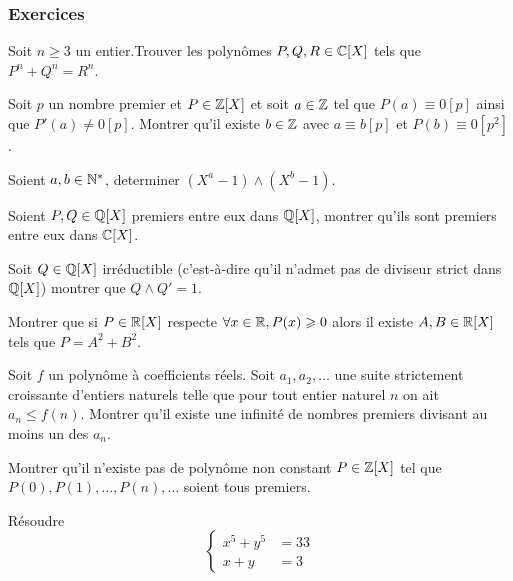 \subsubsection{Exercices}


\begin{exo}[Liouville,D]
Soit $n\ge 3 $ un entier.Trouver les polynômes $P,Q,R\in \mathbb C[X]$ tels que $P^n+Q^n=R^n$.
\end{exo}


\begin{exo}[Hensel,M-D]
Soit $p$ un nombre premier et $P\in \mathbb Z[X]$ et soit $a\in \mathbb Z$ tel que $P(a)\equiv 0 [p]$ ainsi que $P'(a)\ne 0 [p] $. Montrer qu'il existe $b\in \mathbb Z$ avec $a\equiv b[p]$ et $P(b)\equiv 0 [p^2]$.
\end{exo}


\begin{exo}[Euclide,M]
Soient $a,b\in \mathbb N^*$, determiner $(X^a-1)\wedge(X^b-1) $.
\end{exo}


\begin{exo}
Soient $P,Q\in \mathbb Q[X]$ premiers entre eux dans $\mathbb Q[X]$, montrer qu'ils sont premiers entre eux dans $\mathbb C[X]$.
\end{exo}


\begin{exo}
Soit $Q\in \mathbb Q[X]$ irréductible (c'est-à-dire qu'il n'admet pas de diviseur strict dans $\mathbb Q[X]$) montrer que $Q\wedge Q'=1$.
\end{exo}


\begin{exo}
Montrer que si $P\in \mathbb R[X]$ respecte $\forall x \in \mathbb R, P(x)\geqslant 0$ alors il existe $A,B\in \mathbb R[X]$ tels que $P=A^2+B^2$.
\end{exo}


\begin{exo}[M-D]
Soit $f$ un polynôme à coefficients réels. Soit $a_1,a_2,\ldots$ une suite strictement croissante d'entiers naturels telle que pour tout entier naturel $n$ on ait $a_n\le f(n)$. Montrer qu'il existe une infinité de nombres premiers divisant au moins un des $a_n$.
\end{exo}


\begin{exo}[F-M]
Montrer qu'il n'existe pas de polynôme non constant $P\in \mathbb Z[X]$ tel que $P(0),P(1),\dots,P(n),\dots$ soient tous premiers.
\end{exo}


\begin{exo}[M]
Résoudre
$$\begin{cases} x^5 + y^5 & = 33 \\ x + y & = 3 \end{cases}$$
\end{exo}


